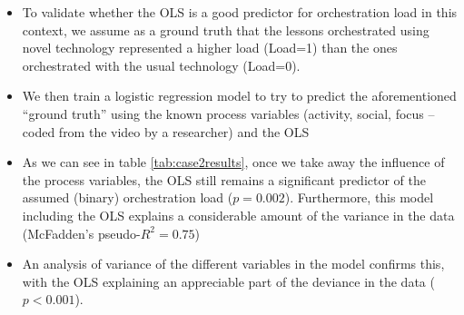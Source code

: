 \documentclass[10pt,journal,compsoc]{IEEEtran}
\begin{document}
\begin{itemize}
\item To validate whether the OLS is a good predictor for orchestration load in this context, we assume as a ground truth that the lessons orchestrated using novel technology represented a higher load (Load=1) than the ones orchestrated with the usual technology (Load=0). 
\item We then train a logistic regression model to try to predict the aforementioned ``ground truth'' using the known process variables (activity, social, focus -- coded from the video by a researcher) and the OLS
\item As we can see in table \ref{tab:case2results}, once we take away the influence of the process variables, the OLS still remains a significant predictor of the assumed (binary) orchestration load ($p=0.002$). Furthermore, this model including the OLS explains a considerable amount of the variance in the data (McFadden's pseudo-$R^2=0.75$) 
\item An analysis of variance of the different variables in the model confirms this, with the OLS explaining an appreciable part of the deviance in the data ($p<0.001$). 
\end{itemize}
\end{document}

